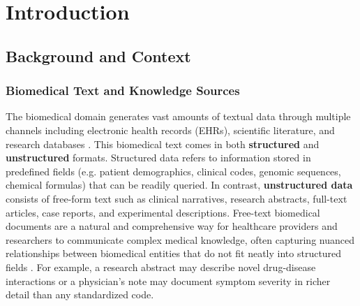 
\chapter{Introduction} %

\label{Chapter1} %


\newcommand{\keyword}[1]{\textbf{#1}}
\newcommand{\tabhead}[1]{\textbf{#1}}
\newcommand{\code}[1]{\texttt{#1}}
\newcommand{\file}[1]{\texttt{\bfseries#1}}
\newcommand{\option}[1]{\texttt{\itshape#1}}


\section{Background and Context}

\subsection{Biomedical Text and Knowledge Sources}

The biomedical domain generates vast amounts of textual data through multiple channels including electronic health records (EHRs), scientific literature, and research databases \parencite{Kong2019}. This biomedical text comes in both \textbf{structured} and \textbf{unstructured} formats. Structured data refers to information stored in predefined fields (e.g. patient demographics, clinical codes, genomic sequences, chemical formulas) that can be readily queried. In contrast, \textbf{unstructured data} consists of free-form text such as clinical narratives, research abstracts, full-text articles, case reports, and experimental descriptions. Free-text biomedical documents are a natural and comprehensive way for healthcare providers and researchers to communicate complex medical knowledge, often capturing nuanced relationships between biomedical entities that do not fit neatly into structured fields \parencite{Laue2024}. For example, a research abstract may describe novel drug-disease interactions or a physician's note may document symptom severity in richer detail than any standardized code.

